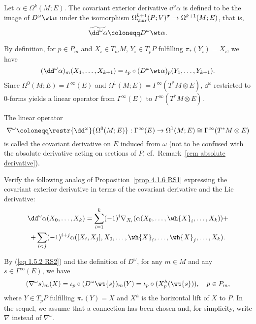 \begin{defn}
    Let $\alpha\in\Omega^k(M;E)$. The covariant exterior derivative $\dd^\omega\alpha$ is defined to be the image of $D^\omega\wt\alpha$ under the isomorphism $\Omega^{k+1}_{\hor}(P;V)^\sigma\to \Omega^{k+1}(M;E)$, that is,
    \[\widetilde{\dd^\omega\alpha}\coloneqq D^\omega\wt\alpha.\]
\end{defn}

By definition, for $p\in P_m$ and $X_i\in T_mM$, $Y_i\in T_pP$ fulfilling $\pi_\ast(Y_i)=X_i$, we have
\[(\dd^\omega\alpha)_m(X_1,\ldots,X_{k+1})=\iota_p\circ(D^\omega\wt\alpha)_p(Y_1,\ldots,Y_{k+1}).\label{eq 1.5.2 RS2}\]
Since $\Omega^0(M;E)=\Gamma^\infty(E)$ and $\Omega^1(M;E)=\Gamma^\infty(T^\ast M\otimes E)$, $\dd^\omega$ restricted to $0$-forms yields a linear operator from $\Gamma^\infty(E)$ to $\Gamma^\infty(T^\ast M\otimes E)$.

\begin{defn}
    The linear operator
    \[\nabla^\omega\coloneqq \restr{\dd^\omega}{\Omega^0(M;E)}:\Gamma^\infty(E)\to \Omega^1(M;E)\cong\Gamma^\infty(T^\ast M\otimes E)\]
    is called the covariant derivative on $E$ induced from $\omega$ (not to be confused with the absolute derivative acting on sections of $P$, cf.\ Remark~\ref{rem absolute derivative}). 
\end{defn}

\begin{xca}
    Verify the following analog of Proposition~\ref{prop 4.1.6 RS1} expressing the covariant exterior derivative in terms of the covariant derivative and the Lie derivative:
        \begin{multline}
            \dd^\omega \alpha(X_0,\ldots,X_k)= \sum_{i=1}^k(-1)^i \nabla_{X_i}(\alpha(X_0,\ldots,\wh{X}_i,\ldots,X_k))+\\+\sum_{i<j}(-1)^{i+j}\alpha([X_i,X_j],X_0,\ldots,\wh{X}_i,\ldots,\wh{X}_j,\ldots,X_k).
        \end{multline}
\end{xca}

By (\ref{eq 1.5.2 RS2}) and the definition of $D^\omega$, for any $m\in M$ and any $s\in \Gamma^\infty(E)$, we have
\[(\nabla^\omega s)_m(X)=\iota_p\circ (D^\omega \wt{s})_m(Y)=\iota_p\circ (X_p^h(\wt{s})),\quad p\in P_m,\label{eq 1.5.3 RS2}\]
where $Y\in T_pP$ fulfilling $\pi_\ast(Y)=X$ and $X^h$ is the horizontal lift of $X$ to $P$. In the sequel, we assume that a connection has been chosen and, for simplicity, write $\nabla$ instead of $\nabla^\omega$.

